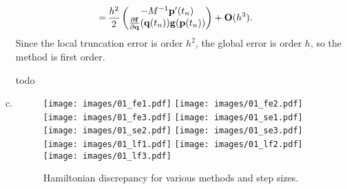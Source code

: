 \begin{solution}
\begin{enumerate}[(a)]
\begin{align*}
      =\, & \frac{h^2}{2}
      \begin{pmatrix}
        -M^{-1} \mathbf{p}'(t_n) \\
        \frac{\partial \mathbf{f}}{\partial \mathbf{q}}(\mathbf{q}(t_n))\mathbf{g}(\mathbf{p}(t_n))
      \end{pmatrix}
      + \mathbf{O}(h^3).
    \end{align*}
    Since the local truncation error is order $h^2$, the global error is order $h$, so the method is first order.
    \item [todo]
    \item 
    \begin{figure}
      \centering
      \texttt{[image: images/01\_fe1.pdf]}
      \texttt{[image: images/01\_fe2.pdf]}
      \texttt{[image: images/01\_fe3.pdf]}
      \texttt{[image: images/01\_se1.pdf]}
      \texttt{[image: images/01\_se2.pdf]}
      \texttt{[image: images/01\_se3.pdf]}
      \texttt{[image: images/01\_lf1.pdf]}
      \texttt{[image: images/01\_lf2.pdf]}
      \texttt{[image: images/01\_lf3.pdf]}
      \caption{Hamiltonian discrepancy for various methods and step sizes.}
      \label{F:hamiltonian}
    \end{figure}
  \end{enumerate}
\end{solution}
